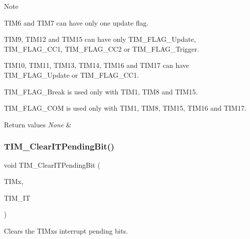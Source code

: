 \begin{DoxyNote}{Note}

\begin{DoxyItemize}
\item T\+I\+M6 and T\+I\+M7 can have only one update flag.
\item T\+I\+M9, T\+I\+M12 and T\+I\+M15 can have only T\+I\+M\+\_\+\+F\+L\+A\+G\+\_\+\+Update, T\+I\+M\+\_\+\+F\+L\+A\+G\+\_\+\+C\+C1, T\+I\+M\+\_\+\+F\+L\+A\+G\+\_\+\+C\+C2 or T\+I\+M\+\_\+\+F\+L\+A\+G\+\_\+\+Trigger.
\item T\+I\+M10, T\+I\+M11, T\+I\+M13, T\+I\+M14, T\+I\+M16 and T\+I\+M17 can have T\+I\+M\+\_\+\+F\+L\+A\+G\+\_\+\+Update or T\+I\+M\+\_\+\+F\+L\+A\+G\+\_\+\+C\+C1.
\item T\+I\+M\+\_\+\+F\+L\+A\+G\+\_\+\+Break is used only with T\+I\+M1, T\+I\+M8 and T\+I\+M15.
\item T\+I\+M\+\_\+\+F\+L\+A\+G\+\_\+\+C\+OM is used only with T\+I\+M1, T\+I\+M8, T\+I\+M15, T\+I\+M16 and T\+I\+M17.
\end{DoxyItemize}
\end{DoxyNote}

\begin{DoxyRetVals}{Return values}
{\em None} & \\
\hline
\end{DoxyRetVals}
\mbox{\label{group___t_i_m___exported___functions_ga9eb1e95af71ed380f51a2c6d585cc5d6}} 
\subsubsection{\texorpdfstring{TIM\_ClearITPendingBit()}{TIM\_ClearITPendingBit()}}
{\footnotesize\ttfamily void T\+I\+M\+\_\+\+Clear\+I\+T\+Pending\+Bit (\begin{DoxyParamCaption}\item[{\mbox{\hyperlink{struct_t_i_m___type_def}{T\+I\+M\+\_\+\+Type\+Def}} $\ast$}]{T\+I\+Mx,  }\item[{uint16\+\_\+t}]{T\+I\+M\+\_\+\+IT }\end{DoxyParamCaption})}



Clears the T\+I\+Mx\textquotesingle{}s interrupt pending bits. 


